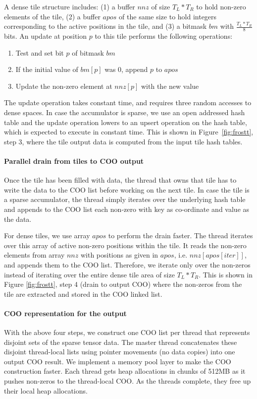 A dense tile structure includes:
(1) a buffer $\mathit{nnz}$ of size $\mathit{T_L} \ast \mathit{T_R} $ to hold non-zero elements of the tile, (2) a buffer 
$\mathit{apos}$ of the same size to hold integers corresponding to the active positions in the tile, and 
(3) a bitmask $\mathit{bm}$ with $\frac{\mathit{T_L} \ast \mathit{T_R}}{8}$ bits.
An update at position $p$ to this tile performs the following operations:
\begin{enumerate}
    \item Test and set bit $p$ of bitmask $\mathit{bm}$
    \item If the initial value of $\mathit{bm[p]}$ was $0$, append $\mathit{p}$ to $\mathit{apos}$
    \item Update the non-zero element at $\mathit{nnz[p]}$ with the new value
\end{enumerate}
The update operation takes constant time, and requires three random accesses to dense spaces.
In case the accumulator is sparse, we use an open addressed hash table and the update operation lowers to an upsert operation on the hash table, which is expected to execute in constant time.
This is shown in Figure~\ref{fig:frostt}, step 3, where the tile output data is computed from the input tile hash tables.

\paragraph{Parallel drain from tiles to COO output}
Once the tile has been filled with data,
the thread that owns that tile has to write the data to the COO list before working on the next tile.
In case the tile is a sparse accumulator, the thread simply iterates over the underlying hash table and appends to the COO list each non-zero with key as co-ordinate and value as the data.

For dense tiles, we use array $\mathit{apos}$ to perform the drain faster.
The thread iterates over this array of active non-zero positions within the tile.
It reads the non-zero elements from array $\mathit{nnz}$ with positions as given in $\mathit{apos}$, i.e. $\mathit{nnz[apos[iter]]}$, and appends them to the COO list.
Therefore, we iterate only over the non-zeros instead of iterating over the entire dense tile area of size $\mathit{T_L} \ast \mathit{T_R}$.
This is shown in Figure \ref{fig:frostt}, step 4 (drain to output COO) where the non-zeros from the tile are extracted and stored in the COO linked list.

\paragraph{COO representation for the output}
With the above four steps, we construct one COO list per thread that represents disjoint sets of the sparse tensor data.
The master thread concatenates these disjoint thread-local lists
using pointer movements (no data copies) into one output COO result.
We implement a memory pool layer to make the COO construction faster.
Each thread gets heap allocations in chunks of 512MB as it pushes non-zeros to the thread-local COO.
As the threads complete, they free up their local heap allocations.



